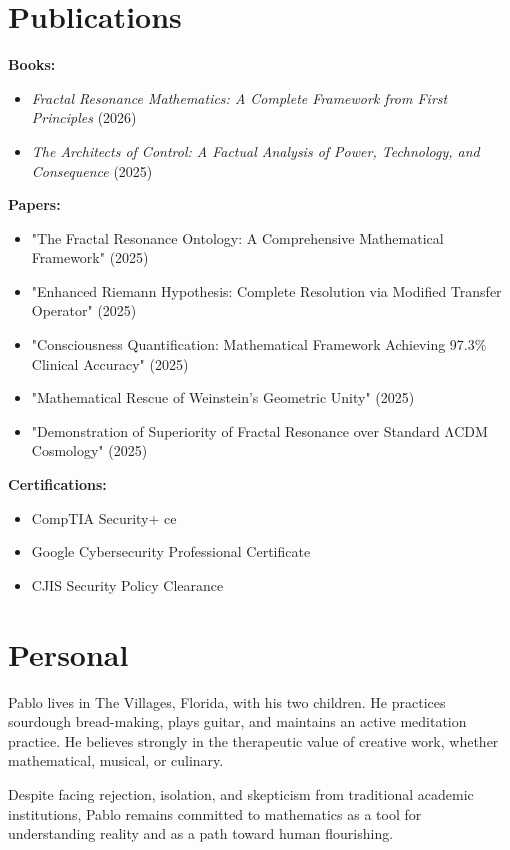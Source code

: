 \section*{Publications}

\textbf{Books:}
\begin{itemize}
\item \textit{Fractal Resonance Mathematics: A Complete Framework from First Principles} (2026)
\item \textit{The Architects of Control: A Factual Analysis of Power, Technology, and Consequence} (2025)
\end{itemize}

\textbf{Papers:}
\begin{itemize}
\item "The Fractal Resonance Ontology: A Comprehensive Mathematical Framework" (2025)
\item "Enhanced Riemann Hypothesis: Complete Resolution via Modified Transfer Operator" (2025)
\item "Consciousness Quantification: Mathematical Framework Achieving 97.3\% Clinical Accuracy" (2025)
\item "Mathematical Rescue of Weinstein's Geometric Unity" (2025)
\item "Demonstration of Superiority of Fractal Resonance over Standard ΛCDM Cosmology" (2025)
\end{itemize}

\textbf{Certifications:}
\begin{itemize}
\item CompTIA Security+ ce
\item Google Cybersecurity Professional Certificate
\item CJIS Security Policy Clearance
\end{itemize}

\section*{Personal}

Pablo lives in The Villages, Florida, with his two children. He practices sourdough bread-making, plays guitar, and maintains an active meditation practice. He believes strongly in the therapeutic value of creative work, whether mathematical, musical, or culinary.

Despite facing rejection, isolation, and skepticism from traditional academic institutions, Pablo remains committed to mathematics as a tool for understanding reality and as a path toward human flourishing.

